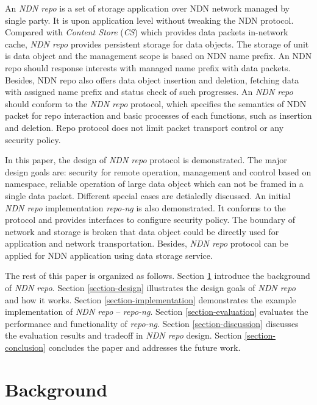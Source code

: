 \documentclass[conference]{IEEEtran}
\begin{document}
An \emph{NDN repo} is a set of storage application over NDN network managed by single party. It is upon application level without tweaking the NDN protocol. Compared with \emph{Content Store} (\emph{CS}) which provides data packets in-network cache, \emph{NDN repo} provides persistent storage for data objects. The storage of unit is data object and the management scope is based on NDN name prefix. An NDN repo should response interests with managed name prefix with data packets. Besides, NDN repo also offers data object insertion and deletion, fetching data with assigned name prefix and status check of such progresses. An \emph{NDN repo} should conform to the \emph{NDN repo} protocol, which specifies the semantics of NDN packet for repo interaction and basic processes of each functions, such as insertion and deletion. Repo protocol does not limit packet transport control or any security policy.

In this paper, the design of \emph{NDN repo} protocol is demonstrated. The major design goals are: security for remote operation, management and control based on namespace, reliable operation of large data object which can not be framed in a single data packet. Different special cases are detialedly discussed. An initial \emph{NDN repo} implementation \emph{repo-ng} is also demonstrated. It conforms to the protocol and provides interfaces to configure security policy. The boundary of network and storage is broken that data object could be directly used for application and network transportation. Besides, \emph{NDN repo} protocol can be applied for NDN application using data storage service.

The rest of this paper is organized as follows. Section \ref{section-background} introduce the background of \emph{NDN repo}.  Section \ref{section-design} illustrates the design goals of \emph{NDN repo} and how it works. Section \ref{section-implementation} demonstrates the example implementation of \emph{NDN repo} -- \emph{repo-ng}. Section \ref{section-evaluation} evaluates the performance and functionality of \emph{repo-ng}. Section \ref{section-discussion} discusses the evaluation results and tradeoff in \emph{NDN repo} design. Section \ref{section-conclusion} concludes the paper and addresses the future work.

\section{Background} \label{section-background}
\end{document}
